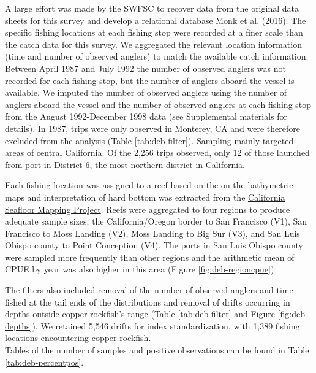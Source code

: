 \documentclass[11pt,
  english,
  letterpaper,
]{article}
\begin{document}
A large effort was made by the SWFSC to recover data from the original data sheets for this survey and develop a relational database Monk et al. (2016). The specific fishing locations at each fishing stop were recorded at a finer scale than the catch data for this survey. We aggregated the relevant location information (time and number of observed anglers) to match the available catch information. Between April 1987 and July 1992 the number of observed anglers was not recorded for each fishing stop, but the number of anglers aboard the vessel is available. We imputed the number of observed anglers using the number of anglers aboard the vessel and the number of observed anglers at each fishing stop from the August 1992-December 1998 data (see Supplemental materials for details). In 1987, trips were only observed in Monterey, CA and were therefore excluded from the analysis (Table \ref{tab:deb-filter}). Sampling mainly targeted areas of central California. Of the 2,256 trips observed, only 12 of those launched from port in District 6, the most northern district in California.

Each fishing location was assigned to a reef based on the on the bathymetric maps and interpretation of hard bottom was extracted from the \href{http://seafloor.otterlabs.org/index.html}{California Seafloor Mapping Project}. Reefs were aggregated to four regions to produce adequate sample sizes; the California/Oregon border to San Francisco (V1), San Francisco to Moss Landing (V2), Moss Landing to Big Sur (V3), and San Luis Obispo county to Point Conception (V4). The ports in San Luis Obispo county were sampled more frequently than other regions and the arithmetic mean of CPUE by year was also higher in this area (Figure \ref{fig:deb-regioncpue})

The filters also included removal of the number of observed anglers and time fished at the tail ends of the distributions and removal of drifts occurring in depths outside copper rockfish's range (Table \ref{tab:deb-filter} and Figure \ref{fig:deb-depths}). We retained 5,546 drifts for index standardization, with 1,389 fishing locations encountering copper rockfish.\\
Tables of the number of samples and positive observations can be found in Table \ref{tab:deb-percentpos}.
\end{document}
